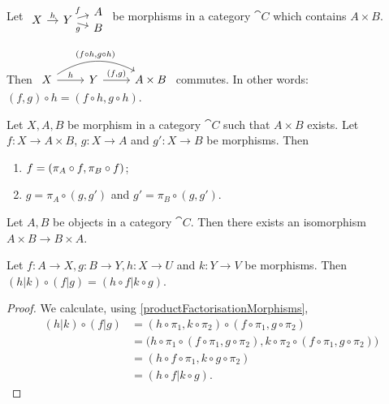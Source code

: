 \begin{lemma} \label{compositionProjectionMorphisms}
Let $\begin{tikzcd}[row sep=-0.7em, column sep=1em]
&& A \\
X \ar[r, "h"] & Y \ar[ur, "f"] \ar[dr, swap, "g"] & \\
&& B
\end{tikzcd}$ be morphisms in a category $\cat{C}$ which contains $A\times B$.

Then
$\begin{tikzcd}
X \ar[r, "h"] \ar[rr, bend left, "{(f\circ h,g \circ h)}"] & Y \ar[r, "{(f,g)}"] & A\times B
\end{tikzcd}$ commutes.
In other words: $(f,g)\circ h = (f\circ h, g\circ h)$.
\end{lemma}

\begin{lemma} \label{productFactorisationMorphisms}
Let $X,A,B$ be morphism in a category $\cat{C}$ such that $A\times B$ exists. Let $f: X\to A\times B$,  $g: X\to A$ and $g': X\to B$ be morphisms. Then
\begin{enumerate}
\item $f = (\pi_A\circ f, \pi_B\circ f)$;
\item $g = \pi_A\circ(g,g')$ and $g' = \pi_B\circ(g,g')$.
\end{enumerate}
\end{lemma}

\begin{lemma}
Let $A,B$ be objects in a category $\cat{C}$. Then there exists an isomorphism $A\times B \to B\times A$.
\end{lemma}

\begin{lemma} \label{parallelCompositionOfMorphisms}
Let $f: A\to X, g: B\to Y, h: X\to U$ and $k: Y\to V$ be morphisms. Then $(h|k)\circ (f|g) = (h\circ f | k\circ g)$.
\end{lemma}
\begin{proof}
We calculate, using \ref{productFactorisationMorphisms},
\begin{align*}
(h|k)\circ (f|g) &= (h\circ \pi_1, k\circ\pi_2) \circ (f\circ \pi_1, g\circ\pi_2) \\
&= \big(h\circ \pi_1\circ (f\circ \pi_1, g\circ\pi_2), k\circ\pi_2\circ (f\circ \pi_1, g\circ\pi_2)\big) \\
&= (h\circ f\circ \pi_1, k\circ g\circ\pi_2) \\
&= (h\circ f | k\circ g).
\end{align*}
\end{proof}

